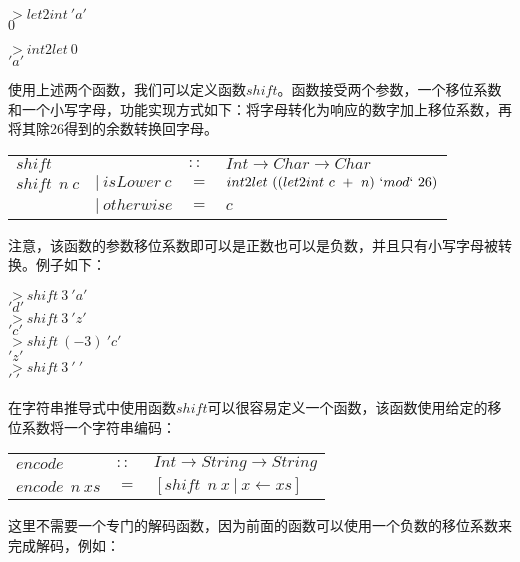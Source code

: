 \noindent\hspace*{1cm}$>let2int~'a'$\\
\hspace*{1cm}$0$

\noindent\hspace*{1cm}$>int2let~0$\\
\hspace*{1cm}$'a'$

使用上述两个函数，我们可以定义函数$shift$。函数接受两个参数，一个移位系数和一个小写字母，功能实现方式如下：将字母转化为响应的数字加上移位系数，再将其除26得到的余数转换回字母。

\begin{tabular}[t]{llll}
$shift$&&$::$&$Int \rightarrow Char \rightarrow Char$\\
$shift~~n~c$&$|~isLower~c$&$=$&$int2let~((let2int~c~+~n)~`mod`~26)$\\
&$|~otherwise$&$=$&$c$
\end{tabular}

注意，该函数的参数移位系数即可以是正数也可以是负数，并且只有小写字母被转换。例子如下：

\noindent\hspace*{1cm}$>shift~3~'a'$\\
\hspace*{1cm}$'d'$\\
\noindent\hspace*{1cm}$>shift~3~'z'$\\
\hspace*{1cm}$'c'$\\
\noindent\hspace*{1cm}$>shift~(-3)~'c'$\\
\hspace*{1cm}$'z'$\\
\noindent\hspace*{1cm}$>shift~3~'~'$\\
\hspace*{1cm}$'~'$

在字符串推导式中使用函数$shift$可以很容易定义一个函数，该函数使用给定的移位系数将一个字符串编码：

\begin{tabular}[t]{lll}
$encode$&$::$&$Int \rightarrow String \rightarrow String$\\
$encode~~n~xs$&$=$&$[shift~~n~x~|~x \leftarrow xs]$\\
\end{tabular}

这里不需要一个专门的解码函数，因为前面的函数可以使用一个负数的移位系数来完成解码，例如：

